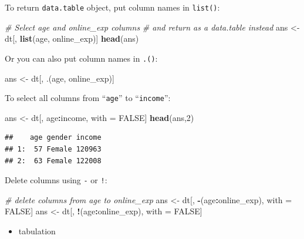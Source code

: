 \documentclass[12pt,]{krantz}
\makeatletter
\newenvironment{Shaded}{\begin{snugshade}}{\end{snugshade}}
\newcommand{\CommentTok}[1]{\textcolor[rgb]{0.37,0.37,0.37}{\textit{#1}}}
\newcommand{\DecValTok}[1]{\textcolor[rgb]{0.06,0.06,0.06}{#1}}
\newcommand{\KeywordTok}[1]{\textcolor[rgb]{0.27,0.27,0.27}{\textbf{#1}}}
\newcommand{\NormalTok}[1]{#1}
\newcommand{\OperatorTok}[1]{\textcolor[rgb]{0.43,0.43,0.43}{\textbf{#1}}}
\newcommand{\OtherTok}[1]{\textcolor[rgb]{0.37,0.37,0.37}{#1}}
\newcommand{\StringTok}[1]{\textcolor[rgb]{0.5,0.5,0.5}{#1}}
\providecommand{\tightlist}{%
  \setlength{\itemsep}{0pt}\setlength{\parskip}{0pt}}
\newenvironment{kframe}{%
\medskip{}
\setlength{\fboxsep}{.8em}
 \def\at@end@of@kframe{}%
 \ifinner\ifhmode%
  \def\at@end@of@kframe{\end{minipage}}%
  \begin{minipage}{\columnwidth}%
 \fi\fi%
 \def\FrameCommand##1{\hskip\@totalleftmargin \hskip-\fboxsep
 \colorbox{shadecolor}{##1}\hskip-\fboxsep
     \hskip-\linewidth \hskip-\@totalleftmargin \hskip\columnwidth}%
 \MakeFramed {\advance\hsize-\width
   \@totalleftmargin\z@ \linewidth\hsize
   \@setminipage}}%
 {\par\unskip\endMakeFramed%
 \at@end@of@kframe}
\renewenvironment{Shaded}{\begin{kframe}}{\end{kframe}}
\makeatother
\begin{document}
To return \texttt{data.table} object, put column names in \texttt{list()}:

\begin{Shaded}
\begin{Highlighting}[]
\CommentTok{# Select age and online_exp columns }
\CommentTok{# and return as a data.table instead}
\NormalTok{ans <-}\StringTok{ }\NormalTok{dt[, }\KeywordTok{list}\NormalTok{(age, online_exp)]}
\KeywordTok{head}\NormalTok{(ans)}
\end{Highlighting}
\end{Shaded}

Or you can also put column names in \texttt{.()}:

\begin{Shaded}
\begin{Highlighting}[]
\NormalTok{ans <-}\StringTok{ }\NormalTok{dt[, .(age, online_exp)]}
\end{Highlighting}
\end{Shaded}

To select all columns from ``\texttt{age}'' to ``\texttt{income}'':

\begin{Shaded}
\begin{Highlighting}[]
\NormalTok{ans <-}\StringTok{ }\NormalTok{dt[, age}\OperatorTok{:}\NormalTok{income, with =}\StringTok{ }\OtherTok{FALSE}\NormalTok{]}
\KeywordTok{head}\NormalTok{(ans,}\DecValTok{2}\NormalTok{)}
\end{Highlighting}
\end{Shaded}

\begin{verbatim}
##    age gender income
## 1:  57 Female 120963
## 2:  63 Female 122008
\end{verbatim}

Delete columns using \texttt{-} or \texttt{!}:

\begin{Shaded}
\begin{Highlighting}[]
\CommentTok{# delete columns from  age to online_exp}
\NormalTok{ans <-}\StringTok{ }\NormalTok{dt[, }\OperatorTok{-}\NormalTok{(age}\OperatorTok{:}\NormalTok{online_exp), with =}\StringTok{ }\OtherTok{FALSE}\NormalTok{]}
\NormalTok{ans <-}\StringTok{ }\NormalTok{dt[, }\OperatorTok{!}\NormalTok{(age}\OperatorTok{:}\NormalTok{online_exp), with =}\StringTok{ }\OtherTok{FALSE}\NormalTok{]}
\end{Highlighting}
\end{Shaded}

\begin{itemize}
\tightlist
\item
  tabulation
\end{itemize}
\end{document}
